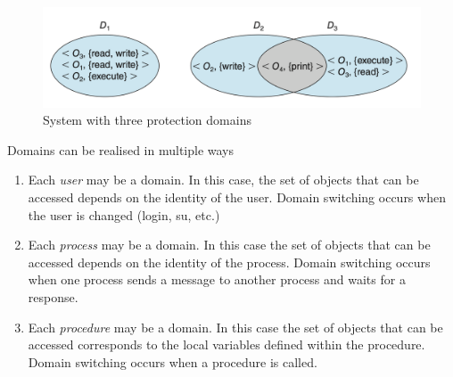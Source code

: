 \documentclass{book/custombook}
\begin{document}
                    \begin{figure}[H]
                        \centering
                        \includegraphics[width=0.6\linewidth]{figures/protection_domains_3.png}
                        \caption{System with three protection domains}
                    \end{figure}
                    Domains can be realised in multiple ways
                    \begin{enumerate}
                        \item Each \textit{user} may be a domain. In this case, the set of objects that can be accessed depends on the identity of the 
                        user. Domain switching occurs when the user is changed (login, su, etc.)
                        \item Each \textit{process} may be a domain. In this case the set of objects that can be accessed depends on the identity of the
                        process. Domain switching occurs when one process sends a message to another process and waits for a response.
                        \item Each \textit{procedure} may be a domain. In this case the set of objects that can be accessed corresponds to the local variables
                        defined within the procedure. Domain switching occurs when a procedure is called.
                    \end{enumerate}
\end{document}
